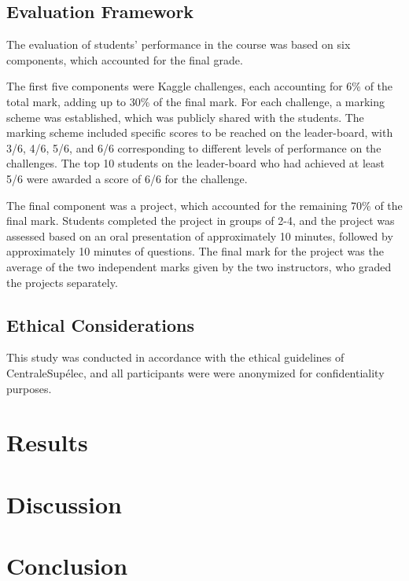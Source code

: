 \documentclass[a4paper]{article}
\begin{document}
\subsection{Evaluation Framework}
The evaluation of students' performance in the course was based on six components, which accounted for the final grade.

The first five components were Kaggle challenges, each accounting for 6\% of the total mark, adding up to 30\% of the final mark.
For each challenge, a marking scheme was established, which was publicly shared with the students.
The marking scheme included specific scores to be reached on the leader-board, with 3/6, 4/6, 5/6, and 6/6 corresponding to different levels of performance on the challenges.
The top 10 students on the leader-board who had achieved at least 5/6 were awarded a score of 6/6 for the challenge.

The final component was a project, which accounted for the remaining 70\% of the final mark.
Students completed the project in groups of 2-4, and the project was assessed based on an oral presentation of approximately 10 minutes, followed by approximately 10 minutes of questions.
The final mark for the project was the average of the two independent marks given by the two instructors, who graded the projects separately.

\subsection{Ethical Considerations}
This study was conducted in accordance with the ethical guidelines of CentraleSupélec, and all participants were were anonymized for confidentiality purposes.

\section{Results}
\section{Discussion}
\section{Conclusion}
\end{document}
